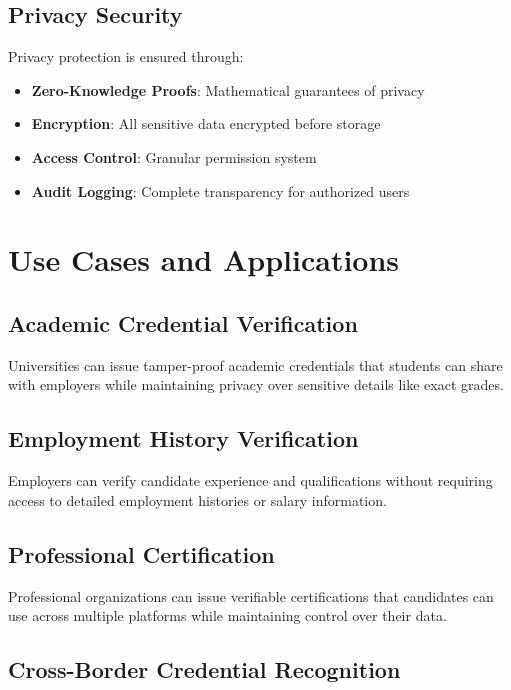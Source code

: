\documentclass[conference]{IEEEtran}
\begin{document}
\subsection{Privacy Security}

Privacy protection is ensured through:

\begin{itemize}
\item \textbf{Zero-Knowledge Proofs}: Mathematical guarantees of privacy
\item \textbf{Encryption}: All sensitive data encrypted before storage
\item \textbf{Access Control}: Granular permission system
\item \textbf{Audit Logging}: Complete transparency for authorized users
\end{itemize}

\section{Use Cases and Applications}

\subsection{Academic Credential Verification}

Universities can issue tamper-proof academic credentials that students can share with employers while maintaining privacy over sensitive details like exact grades.

\subsection{Employment History Verification}

Employers can verify candidate experience and qualifications without requiring access to detailed employment histories or salary information.

\subsection{Professional Certification}

Professional organizations can issue verifiable certifications that candidates can use across multiple platforms while maintaining control over their data.

\subsection{Cross-Border Credential Recognition}
\end{document}
